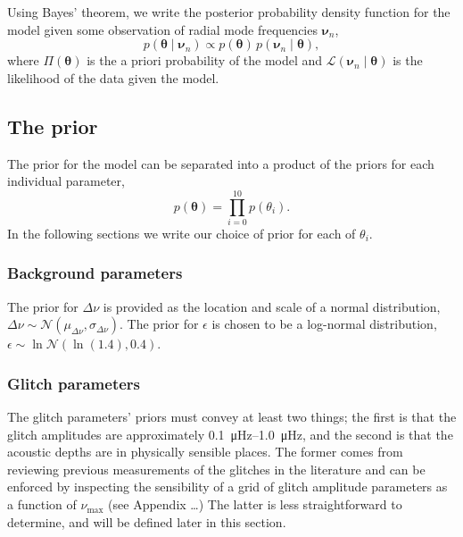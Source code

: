 \documentclass[linenumbers,modern]{aastex631dm}
\begin{document}
Using Bayes' theorem, we write the posterior probability density function for
the model given some observation of radial mode frequencies \(\bm\nu_n\),
%
\begin{equation}
    p(\bm\theta \mid \bm\nu_n) \propto p(\bm\theta) \, 
    p(\bm\nu_n \mid \bm\theta),
\end{equation}
%
where \(\Pi(\bm\theta)\) is the a priori probability of the model and
\(\mathcal{L}(\bm\nu_n \mid \bm\theta)\) is the likelihood of the data given the
model.


\subsection{The prior}\label{sec:prior}

The prior for the model can be separated into a product of the priors for each
individual parameter,
%
\begin{equation}
    p(\bm\theta) = \prod_{i=0}^{10} p(\theta_i).
\end{equation}
%
In the following sections we write our choice of prior for each of
\(\theta_i\).


\subsubsection{Background parameters}\label{sec:bkg-params}

The prior for \(\Delta\nu\) is provided as the location and scale of a
normal distribution, \(\Delta\nu \sim \mathcal{N}(\mu_{\Delta\nu},
\sigma_{\Delta\nu})\). The prior for \(\epsilon\) is chosen to be a log-normal
distribution, \(\epsilon \sim \ln\mathcal{N}(\ln(1.4), 0.4)\).


\subsubsection{Glitch parameters}\label{sec:glitch-params}

The glitch parameters' priors must convey at least two things; the first is
that the glitch amplitudes are approximately \SIrange{0.1}{1.0}{\micro\hertz}, 
and the second is that the acoustic depths are in physically sensible places.
The former comes from reviewing previous measurements of the glitches in the
literature and can be enforced by inspecting the sensibility of a grid of
glitch amplitude parameters as a function of \(\nu_\mathrm{max}\) (see
Appendix \ldots) The latter is less straightforward to determine, and will be
defined later in this section.
\end{document}
